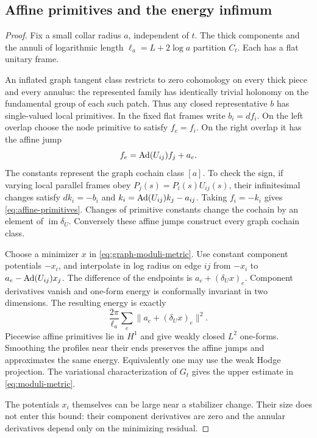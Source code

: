 \subsection{Affine primitives and the energy infimum}
\begin{proof}
Fix a small collar radius $a$, independent
of $t$. The thick components and the
annuli of logarithmic length
$\ell_a=L+2\log a$ partition $C_t$.
Each has a flat unitary frame.

An inflated graph tangent class restricts
to zero cohomology on every thick piece
and every annulus: the represented family
has identically trivial holonomy on the
fundamental group of each such patch.
Thus any closed representative $b$ has
single-valued local primitives. In
the fixed flat frames write $b_i=df_i$.
On the left overlap choose the node
primitive to satisfy $f_e=f_i$.
On the right overlap it has the affine
jump
\begin{equation}\label{eq:affine-primitives}
 f_e=\operatorname{Ad}(U_{ij})f_j+a_e .
\end{equation}
The constants represent the graph
cochain class $[a]$. To check the sign,
if varying local parallel frames obey
$P_j(s)=P_i(s)U_{ij}(s)$, their
infinitesimal changes satisfy
$dk_i=-b_i$ and
$k_i=\operatorname{Ad}(U_{ij})k_j-a_{ij}$.
Taking $f_i=-k_i$ gives
\eqref{eq:affine-primitives}.
Changes of primitive constants change
the cochain by an element of
$\operatorname{im}\delta_U$.
Conversely these affine jumps construct
every graph cochain class.

Choose a minimizer $x$ in
\eqref{eq:graph-moduli-metric}.
Use constant component potentials
$-x_i$, and interpolate in log radius
on edge $ij$ from $-x_i$ to
$a_e-\operatorname{Ad}(U_{ij})x_j$.
The difference of the endpoints is
$a_e+(\delta_Ux)_e$.
Component derivatives vanish and
one-form energy is conformally invariant
in two dimensions. The resulting
energy is exactly
\[
 \frac{2\pi}{\ell_a}
        \sum_e\|a_e+(\delta_Ux)_e\|^2 .
\]
Piecewise affine primitives lie in
$H^1$ and give weakly closed $L^2$
one-forms. Smoothing the profiles
near their ends preserves the affine
jumps and approximates the same energy.
Equivalently one may use the weak
Hodge projection. The variational
characterization of $G_t$ gives the
upper estimate in
\eqref{eq:moduli-metric}.

The potentials $x_i$ themselves can be
large near a stabilizer change. Their
size does not enter this bound:
their component derivatives are zero
and the annular derivatives depend
only on the minimizing residual.


\end{proof}
